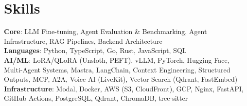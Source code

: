 \documentclass[letterpaper,11pt]{article}
\begin{document}
\section{Skills}
 \begin{itemize}[leftmargin=0.15in, label={}]
    \small{\item{
     \textbf{Core}{: LLM Fine-tuning, Agent Evaluation \& Benchmarking, Agent Infrastructure, RAG Pipelines, Backend Architecture} \\[1.6mm]
     \textbf{Languages}{: Python, TypeScript, Go, Rust, JavaScript, SQL} \\[1.6mm]
     \textbf{AI/ML}{: LoRA/QLoRA (Unsloth, PEFT), vLLM, PyTorch, Hugging Face, Multi-Agent Systems, Mastra, LangChain, Context Engineering, Structured Outputs, MCP, A2A, Voice AI (LiveKit), Vector Search (Qdrant, FastEmbed)} \\[1.6mm]
     \textbf{Infrastructure}{: Modal, Docker, AWS (S3, CloudFront), GCP, Nginx, FastAPI, GitHub Actions, PostgreSQL, Qdrant, ChromaDB, tree-sitter} \\[1.6mm]
    }}
 \end{itemize}
\end{document}
